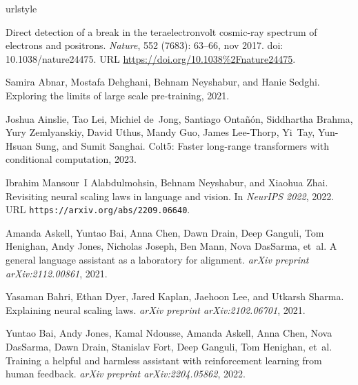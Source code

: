 \documentclass{article} %
\begin{document}
\begin{thebibliography}{61}
\providecommand{\natexlab}[1]{#1}
\providecommand{\url}[1]{\texttt{#1}}
\expandafter\ifx\csname urlstyle\endcsname\relax
  \providecommand{\doi}[1]{doi: #1}\else
  \providecommand{\doi}{doi: \begingroup \urlstyle{rm}\Url}\fi

Direct detection of a break in the teraelectronvolt cosmic-ray spectrum of
  electrons and positrons.
\newblock \emph{Nature}, 552 (7683): 63--66, nov 2017.
\newblock \doi{10.1038/nature24475}.
\newblock URL \url{https://doi.org/10.1038%2Fnature24475}.

Samira Abnar, Mostafa Dehghani, Behnam Neyshabur, and Hanie Sedghi.
\newblock Exploring the limits of large scale pre-training, 2021.

Joshua Ainslie, Tao Lei, Michiel de~Jong, Santiago Ontañón, Siddhartha
  Brahma, Yury Zemlyanskiy, David Uthus, Mandy Guo, James Lee-Thorp, Yi~Tay,
  Yun-Hsuan Sung, and Sumit Sanghai.
\newblock Colt5: Faster long-range transformers with conditional computation,
  2023.

Ibrahim Mansour~I Alabdulmohsin, Behnam Neyshabur, and Xiaohua Zhai.
\newblock Revisiting neural scaling laws in language and vision.
\newblock In \emph{NeurIPS 2022}, 2022.
\newblock URL \url{https://arxiv.org/abs/2209.06640}.

Amanda Askell, Yuntao Bai, Anna Chen, Dawn Drain, Deep Ganguli, Tom Henighan,
  Andy Jones, Nicholas Joseph, Ben Mann, Nova DasSarma, et~al.
\newblock A general language assistant as a laboratory for alignment.
\newblock \emph{arXiv preprint arXiv:2112.00861}, 2021.

Yasaman Bahri, Ethan Dyer, Jared Kaplan, Jaehoon Lee, and Utkarsh Sharma.
\newblock Explaining neural scaling laws.
\newblock \emph{arXiv preprint arXiv:2102.06701}, 2021.

Yuntao Bai, Andy Jones, Kamal Ndousse, Amanda Askell, Anna Chen, Nova DasSarma,
  Dawn Drain, Stanislav Fort, Deep Ganguli, Tom Henighan, et~al.
\newblock Training a helpful and harmless assistant with reinforcement learning
  from human feedback.
\newblock \emph{arXiv preprint arXiv:2204.05862}, 2022.


\end{thebibliography}
\end{document}

